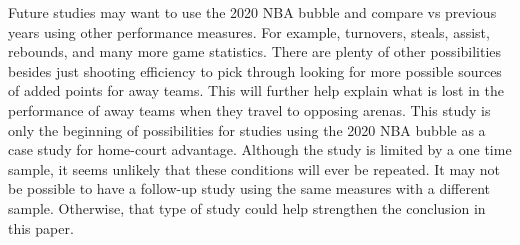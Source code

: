 \documentclass[12pt, letterpaper, titlepage]{article}
\begin{document}
Future studies may want to use the 2020 NBA bubble and compare vs previous years
using other performance measures. For example, turnovers, steals, assist, rebounds,
and many more game statistics. There are plenty of other possibilities besides
just shooting efficiency to pick through looking for more possible sources of
added points for away teams. This will further help explain what is lost in the
performance of away teams when they travel to opposing arenas. This study is only
the beginning of possibilities for studies using the 2020 NBA bubble as a case study
for home-court advantage. Although the study is limited by a one time
sample, it seems unlikely that these conditions will ever be
repeated. It may not be possible to have a follow-up study using the
same measures with a different sample. Otherwise, that type of study
could help strengthen the conclusion in this paper.




\end{document}
